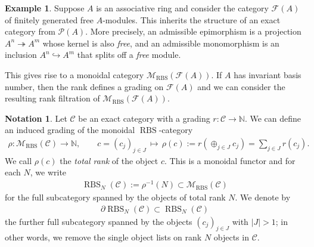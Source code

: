 \documentclass[12pt, reqno]{amsart}
\theoremstyle{plain}
\theoremstyle{definition}
\newtheorem{example}[theorem]{Example}
\newtheorem{notation}[theorem]{Notation}
\newcommand{\N}{\mathbb N}
\begin{document}
\begin{example}\label{free rank filtration}
Suppose $A$ is an associative ring and consider the category $\mathcal{F}(A)$ of finitely generated free $A$-modules. This inherits the structure of an exact category from $\mathcal{P}(A)$. More precisely, an admissible epimorphism is a projection $A^n\twoheadrightarrow A^m$ whose kernel is also \textit{free}, and an admissible monomorphism is an inclusion $A^n\hookrightarrow A^m$ that splits off a \textit{free} module.

This gives rise to a monoidal category $\mathscr{M}_{\operatorname{RBS}}(\mathcal{F}(A))$. If $A$ has invariant basis number, then the rank defines a grading on $\mathcal{F}(A)$ and we can consider the resulting rank filtration of $\mathscr{M}_{\operatorname{RBS}}(\mathcal{F}(A))$.
\end{example}


\begin{notation}\label{RBS-pieces}
Let $\mathcal{C}$ be an exact category with a grading $r\colon \mathcal{C}\rightarrow \N$. We can define an induced grading of the monoidal $\operatorname{RBS}$-category
\begin{align*}
\rho\colon \mathscr{M}_{\operatorname{RBS}}(\mathcal{C})\rightarrow \N, \qquad c=(c_j)_{j\in J}\,\mapsto\, \rho(c):=r(\oplus_{j\in J} c_j)=\sum_{j\in J} r(c_j).
\end{align*}
We call $\rho(c)$ the \textit{total rank} of the object $c$. This is a monoidal functor and for each $N$, we write 
\begin{align*}
\operatorname{RBS}_N(\mathcal{C}):=\rho^{-1}(N)\subset \mathscr{M}_{\operatorname{RBS}}(\mathcal{C})
\end{align*}
for the full subcategory spanned by the objects of total rank $N$. We denote by
\begin{align*}
\partial \operatorname{RBS}_N(\mathcal{C})\subset \operatorname{RBS}_N(\mathcal{C})
\end{align*}
the further full subcategory spanned by the objects $(c_j)_{j\in J}$ with $|J|>1$; in other words, we remove the single object lists on rank $N$ objects in $\mathcal{C}$.
\end{notation}
\end{document}
